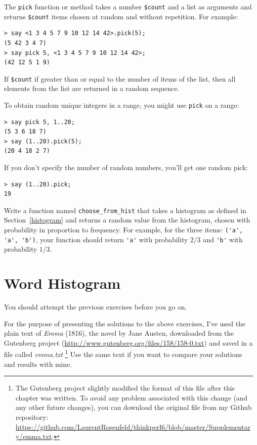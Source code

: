 The {\tt pick} function or method takes a number \verb'$count'  and a list as arguments and returns \verb'$count' items chosen at 
random and without repetition. For example:

\begin{verbatim}
> say <1 3 4 5 7 9 10 12 14 42>.pick(5);
(5 42 3 4 7)
> say pick 5, <1 3 4 5 7 9 10 12 14 42>;
(42 12 5 1 9)
\end{verbatim}

If \verb'$count' if greater than or equal to the number of 
items of the list, then all elements from the list are returned 
in a random sequence.

To obtain random unique integers in a range, you might use 
{\tt pick} on a range:

\begin{verbatim}
> say pick 5, 1..20;
(5 3 6 18 7)
> say (1..20).pick(5);
(20 4 18 2 7)
\end{verbatim}

If you don't specify the number of random numbers, you'll get one 
random pick:

\begin{verbatim}
> say (1..20).pick;
19
\end{verbatim}
%


\begin{exercise}

Write a function named \verb"choose_from_hist" that takes
a histogram as defined in Section~\ref{histogram} and returns a 
random value from the histogram, chosen with probability
in proportion to frequency.  For example, for the three 
items: \verb"('a', 'a', 'b')", your function should 
return \verb"'a'" with probability $2/3$ and \verb"'b'" 
with probability $1/3$.
\end{exercise}


\section{Word Histogram}

You should attempt the previous exercises before you go on.

For the purpose of presenting the solutions to the above 
exercises, I've used the plain text of {\em Emma} (1816), the 
novel by Jane Austen, downloaded from the Gutenberg project 
(\url{http://www.gutenberg.org/files/158/158-0.txt}) and 
saved in a file called \emph{emma.txt} \footnote{The Gutenberg 
project slightly modified the format of this file after this 
chapter was written. To avoid any problem associated with this 
change (and any other future changes), you can download the 
original file from my Github repository: 
\url{https://github.com/LaurentRosenfeld/thinkperl6/blob/master/Supplementary/emma.txt}.} Use the same 
text if you want to compare your solutions and results 
with mine.

